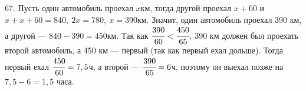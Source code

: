 67. Пусть один автомобиль проехал $x$км, тогда другой проехал $x+60$ и $x+x+60=840,\ 2x=780,\ x=390$км. Значит, один автомобиль проехал 390 км, а другой --- $840-390=450$км. Так как $\cfrac{390}{60}<\cfrac{450}{65},$ 390 км должен был проехать второй автомобиль, а 450 км --- первый (так как первый ехал дольше). Тогда первый ехал $\cfrac{450}{60}=7,5$ч, а второй --- $\cfrac{390}{65}=6$ч, поэтому он выехал позже на $7,5-6=1,5$ часа.\\
